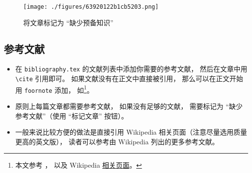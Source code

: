 \begin{figure}[ht]
\centering
\texttt{[image: ./figures/63920122b1cb5203.png]}
\caption{将文章标记为 “缺少预备知识”} \label{fig_WrGuid_2}
\end{figure}

\subsection{参考文献}
\begin{itemize}
\item 在 \verb|bibliography.tex| 的文献列表中添加你需要的参考文献， 然后在文章中用 \verb|\cite| 引用即可。 如果文献没有在正文中直接被引用， 那么可以在正文开始用 \verb|foornote| 添加， 如\footnote{本文参考 \cite{GriffE}， \cite{GriffQ} 以及 Wikipedia \href{https://www.wikipedia.org/}{相关页面}。}。
\item 原则上每篇文章都需要参考文献， 如果没有足够的文献， 需要标记为 “缺少参考文献”（使用 “标记文章” 按钮）。
\item 一般来说比较方便的做法是直接引用 Wikipedia 相关页面（注意尽量选用质量更高的英文版）， 读者可以参考由 Wikipedia 列出的更多参考文献。
\end{itemize}
